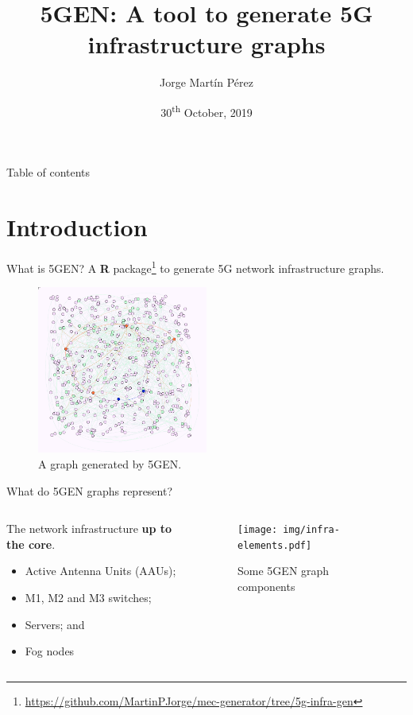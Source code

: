 \documentclass{beamer}
\title{5GEN: A tool to generate 5G infrastructure graphs}
\date{30\textsuperscript{th} October, 2019}
\author{Jorge Martín Pérez}
\begin{document}
\begin{frame}
\titlepage
\end{frame}

\setcounter{framenumber}{0}


\begin{frame}{Table of contents}
    \tableofcontents
\end{frame}

\section{Introduction}
\begin{frame}{What is 5GEN?}
     A \textbf{R} package\footnote{\scriptsize \url{https://github.com/MartinPJorge/mec-generator/tree/5g-infra-gen}} to generate 5G network infrastructure graphs.

    \begin{figure}
        \includegraphics[width=0.5\textwidth]{img/infra-graphs.png}
        \caption{A graph generated by 5GEN.}
        \label{fig:5gen-graph}
    \end{figure}
\end{frame}



\begin{frame}{What do 5GEN graphs represent?}
    \begin{columns}[T]
        \begin{column}{.48\textwidth}
            \vspace{2.5em}
            The network infrastructure \textbf{up to the core}.
            \begin{itemize}
                \item Active Antenna Units (AAUs);
                \item M1, M2 and M3 switches;
                \item Servers; and
                \item Fog nodes
            \end{itemize}
        \end{column}
        \begin{column}{.48\textwidth}
            \begin{figure}
                \texttt{[image: img/infra-elements.pdf]}
                \caption{Some 5GEN graph components}
            \end{figure}
        \end{column}
    \end{columns}
\end{frame}
\end{document}
